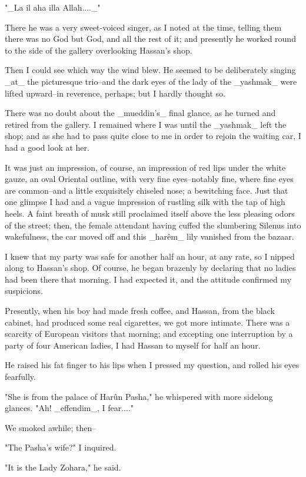 "_La il aha illa Allah...._"

There he was a very sweet-voiced singer, as I noted at the time,
telling them there was no God but God, and all the rest of it; and
presently he worked round to the side of the gallery overlooking
Hassan's shop.

Then I could see which way the wind blew. He seemed to be deliberately
singing _at_ the picturesque trio--and the dark eyes of the lady of
the _yashmak_ were lifted upward--in reverence, perhaps; but I hardly
thought so.

There was no doubt about the _mueddin's_ final glance, as he turned
and retired from the gallery. I remained where I was until the
_yashmak_ left the shop; and as she had to pass quite close to me in
order to rejoin the waiting car, I had a good look at her.

It was just an impression, of course, an impression of red lips under
the white gauze, an oval Oriental outline, with very fine eyes--notably
fine, where fine eyes are common--and a little exquisitely chiseled
nose; a bewitching face. Just that one glimpse I had and a vague
impression of rustling silk with the tap of high heels. A faint breath
of musk still proclaimed itself above the less pleasing odors of the
street; then, the female attendant having cuffed the slumbering Silenus
into wakefulness, the car moved off and this _harêm_ lily vanished from
the bazaar.

I knew that my party was safe for another half an hour, at any rate,
so I nipped along to Hassan's shop. Of course, he began brazenly by
declaring that no ladies had been there that morning. I had expected
it, and the attitude confirmed my suspicions.

Presently, when his boy had made fresh coffee, and Hassan, from the
black cabinet, had produced some real cigarettes, we got more
intimate. There was a scarcity of European visitors that morning; and
excepting one interruption by a party of four American ladies, I had
Hassan to myself for half an hour.

He raised his fat finger to his lips when I pressed my question, and
rolled his eyes fearfully.

"She is from the palace of Harûn Pasha," he whispered with more
sidelong glances. "Ah! _effendim_, I fear...."

We smoked awhile; then--

"The Pasha's wife?" I inquired.

"It is the Lady Zohara," he said.

